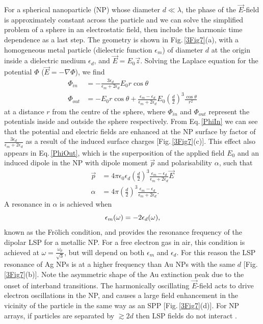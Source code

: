 For a spherical nanoparticle (NP) whose diameter $d\ll\lambda$, the phase of the $\vec{E}$-field is approximately constant across the particle and we can solve the simplified problem of a sphere in an electrostatic field, then include the harmonic time dependence as a last step. The geometry is shown in Fig.\,\ref{3Fig7}(a), with a homogeneous metal particle (dielectric function $\epsilon_m$) of diameter $d$ at the origin inside a dielectric medium $\epsilon_d$, and $\vec{E} = E_0\vec{z}$. Solving the Laplace equation for the potential $\Phi$ ($\vec{E} = -\nabla\Phi$), we find
\begin{subequations}
\label{NPlaplace}
\begin{align}
\Phi_{in} &= -\frac{3\epsilon_d}{\epsilon_m+2\epsilon_d}E_0r\cos\theta \label{PhiIn}\\
\Phi_{out} &= -E_0r\cos\theta+\frac{\epsilon_m-\epsilon_d}{\epsilon_m+2\epsilon_d}E_0\left(\frac{d}{2}\right)^3\frac{\cos\theta}{r^2} \label{PhiOut}
\end{align}
\end{subequations}
at a distance $r$ from the centre of the sphere, where $\Phi_{in}$ and $\Phi_{out}$ represent the potentials inside and outside the sphere respectively. From Eq.\,\ref{PhiIn} we can see that the potential and electric fields are enhanced at the NP surface by factor of $\frac{3\epsilon_d}{\epsilon_m+2\epsilon_d}$ as a result of the induced surface charges [Fig.\,\ref{3Fig7}(c)]. This effect also appears in Eq.\,\ref{PhiOut}, which is the superposition of the applied field $E_0$ and an induced dipole in the NP with dipole moment $\vec{p}$ and polarisability $\alpha$, such that
\begin{subequations}
\label{NPdipole}
\begin{align}
\vec{p} &=4\pi\epsilon_0\epsilon_d\left(\frac{d}{2}\right)^3\frac{\epsilon_m-\epsilon_d}{\epsilon_m+2\epsilon_d}\vec{E} \label{NPmoment}\\
\alpha &= 4\pi\left(\frac{d}{2}\right)^3\frac{\epsilon_m-\epsilon_d}{\epsilon_m+2\epsilon_d} \label{NPpolarisability} .
\end{align}
\end{subequations}
A resonance in $\alpha$ is achieved when 
\begin{equation}
\centering
\epsilon_m(\omega) = -2\epsilon_d(\omega) ,
\label{Frolich}
\end{equation}
known as the Fr\"{o}lich condition, and provides the resonance frequency of the dipolar LSP for a metallic NP. For a free electron gas in air, this condition is achieved at $\omega = \frac{\omega_p}{\sqrt{3}}$, but will depend on both $\epsilon_m$ and $\epsilon_d$. For this reason the LSP resonance of Ag NPs is at a higher frequency than Au NPs with the same $d$ [Fig.\,\ref{3Fig7}(b)]. Note the asymmetric shape of the Au extinction peak due to the onset of interband transitions. The harmonically oscillating $\vec{E}$-field acts to drive electron oscillations in the NP, and causes a large field enhancement in the vicinity of the particle in the same way as an SPP [Fig.\,\ref{3Fig7}(d)]. For NP arrays, if particles are separated by $\gtrsim2d$ then LSP fields do not interact \cite{Rechberger2003}.
